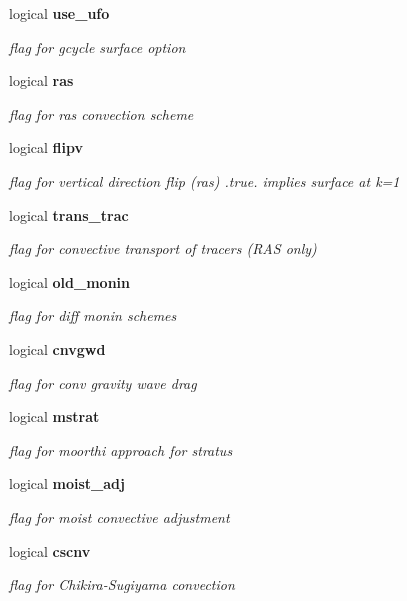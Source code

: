 \begin{DoxyCompactItemize}
logical \textbf{ use\+\_\+ufo}
\begin{DoxyCompactList}\small\item\em flag for gcycle surface option \end{DoxyCompactList}\item 
logical \textbf{ ras}
\begin{DoxyCompactList}\small\item\em flag for ras convection scheme \end{DoxyCompactList}\item 
logical \textbf{ flipv}
\begin{DoxyCompactList}\small\item\em flag for vertical direction flip (ras) .true. implies surface at k=1 \end{DoxyCompactList}\item 
logical \textbf{ trans\+\_\+trac}
\begin{DoxyCompactList}\small\item\em flag for convective transport of tracers (R\+AS only) \end{DoxyCompactList}\item 
logical \textbf{ old\+\_\+monin}
\begin{DoxyCompactList}\small\item\em flag for diff monin schemes \end{DoxyCompactList}\item 
logical \textbf{ cnvgwd}
\begin{DoxyCompactList}\small\item\em flag for conv gravity wave drag \end{DoxyCompactList}\item 
logical \textbf{ mstrat}
\begin{DoxyCompactList}\small\item\em flag for moorthi approach for stratus \end{DoxyCompactList}\item 
logical \textbf{ moist\+\_\+adj}
\begin{DoxyCompactList}\small\item\em flag for moist convective adjustment \end{DoxyCompactList}\item 
logical \textbf{ cscnv}
\begin{DoxyCompactList}\small\item\em flag for Chikira-\/\+Sugiyama convection \end{DoxyCompactList}\item 

\end{DoxyCompactItemize}
